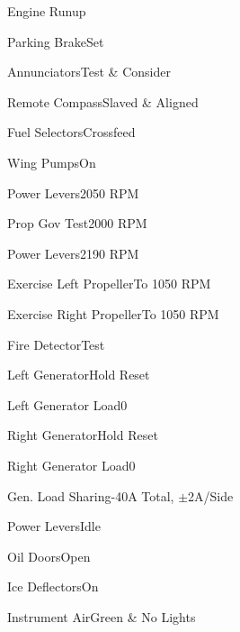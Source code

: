 \documentclass[sim-use]{checklist}
\begin{document}
\begin{checklist}{Engine Runup}
  \item{Parking Brake}{Set}
  \item{Annunciators}{Test \& Consider}
  \item{Remote Compass}{Slaved \& Aligned}
  \item{Fuel Selectors}{Crossfeed}
  \item{Wing Pumps}{On}
  \item{Power Levers}{2050 RPM}
  \item{Prop Gov Test}{2000 RPM}
  \item{Power Levers}{2190 RPM}
  \item{Exercise Left Propeller}{To 1050 RPM}
  \item{Exercise Right Propeller}{To 1050 RPM}
  \item{Fire Detector}{Test}
  
  \item{Left Generator}{Hold Reset}
  \item{Left Generator Load}{0}
  \item{Right Generator}{Hold Reset}
  \item{Right Generator Load}{0}
  \item{Gen. Load Sharing}{-40A Total, $\pm$2A/Side}
  \item{Power Levers}{Idle}
  \item{Oil Doors}{Open}
  \item{Ice Deflectors}{On}
  \item{Instrument Air}{Green \& No Lights}
  
\end{checklist}
\end{document}

